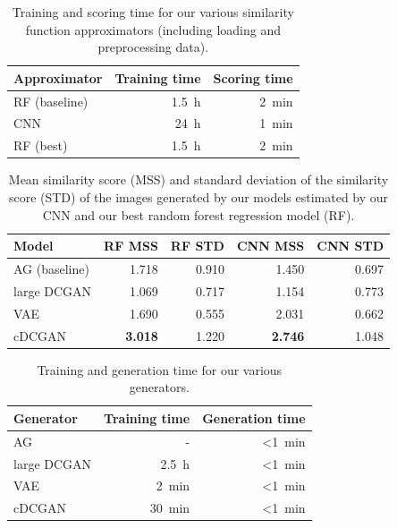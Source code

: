 \documentclass[10pt,conference,compsocconf]{IEEEtran}
\begin{document}
\begin{table}\centering
    \begin{tabular}{lrr}
    \toprule
        Approximator    & Training time     & Scoring time \\
    \midrule
        RF (baseline)   & \SI{1.5}{\hour}     &\SI{2}{\minute} \\
        CNN             & \SI{24}{\hour}    & \SI{1}{\minute}  \\
        RF (best)       & \SI{1.5}{\hour}     & \SI{2}{\minute} \\
    \bottomrule
    \end{tabular}
\caption{Training and scoring time for our various similarity function approximators (including loading and preprocessing data).}\label{tab:SFA_time}
\end{table}

\begin{table}\centering
    \begin{tabular}{lrr|rr}
    \toprule
        Model           & RF MSS                & RF STD        & CNN MSS               & CNN STD \\
    \midrule
        AG (baseline)   & \SI{1.718}{}          & \SI{0.910}{}  & \SI{1.450}{}          & \SI{0.697}{} \\
        large DCGAN     & \SI{1.069}{}          & \SI{0.717}{}  & \SI{1.154}{}          & \SI{0.773}{} \\
        VAE             & \SI{1.690}{}          & \SI{0.555}{}  & \SI{2.031}{}          & \SI{0.662}{} \\
        cDCGAN          & \textbf{\SI{3.018}{}} & \SI{1.220}{}  & \textbf{\SI{2.746}{}} & \SI{1.048}{} \\
    \bottomrule
    \end{tabular}
\caption{Mean similarity score (MSS) and standard deviation of the similarity score (STD) of the images generated by our models estimated by our CNN and our best random forest regression model (RF).}\label{tab:gen_MSS}
\end{table}

\begin{table}\centering
    \begin{tabular}{lrr}
    \toprule
        Generator   & Training time     & Generation time \\
    \midrule
        AG          & -                 & \SI{<1}{\minute} \\
        large DCGAN & \SI{2.5}{\hour}     & \SI{<1}{\minute} \\
        VAE         & \SI{2}{\minute}   & \SI{<1}{\minute} \\
        cDCGAN      & \SI{30}{\minute}  & \SI{<1}{\minute} \\
    \bottomrule
    \end{tabular}
\caption{Training and generation time for our various generators.}
\label{tab:gen_time}
\end{table}
\end{document}
